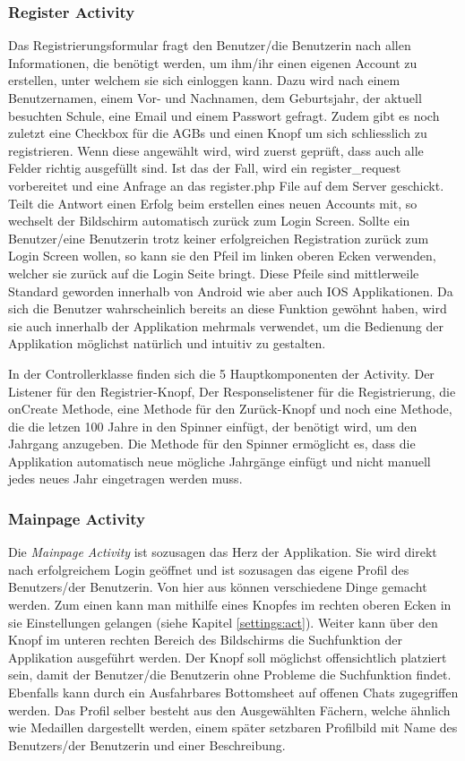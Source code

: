 \documentclass[a4paper,11pt]{report}
\begin{document}
				\subsubsection{Register Activity} \label{register:act}
				Das Registrierungsformular fragt den Benutzer/die Benutzerin nach allen Informationen, die benötigt werden, um ihm/ihr einen eigenen Account zu erstellen, unter welchem sie sich einloggen kann. Dazu wird nach einem Benutzernamen, einem Vor- und Nachnamen, dem Geburtsjahr, der aktuell besuchten Schule, eine Email und einem Passwort gefragt. Zudem gibt es noch zuletzt eine Checkbox für die AGBs und einen Knopf um sich schliesslich zu registrieren. Wenn diese angewählt wird, wird zuerst geprüft, dass auch alle Felder richtig ausgefüllt sind. Ist das der Fall, wird ein register\_request vorbereitet und eine Anfrage an das register.php File auf dem Server geschickt. Teilt die Antwort einen Erfolg beim erstellen eines neuen Accounts mit, so wechselt der Bildschirm automatisch zurück zum Login Screen. Sollte ein Benutzer/eine Benutzerin trotz keiner erfolgreichen Registration zurück zum Login Screen wollen, so kann sie den Pfeil im linken oberen Ecken verwenden, welcher sie zurück auf die Login Seite bringt. Diese Pfeile sind mittlerweile Standard geworden innerhalb von Android wie aber auch IOS Applikationen. Da sich die Benutzer wahrscheinlich bereits an diese Funktion gewöhnt haben, wird sie auch innerhalb der Applikation mehrmals verwendet, um die Bedienung der Applikation möglichst natürlich und intuitiv zu gestalten.
				
				In der Controllerklasse finden sich die 5 Hauptkomponenten der Activity. Der Listener für den Registrier-Knopf, Der Responselistener für die Registrierung, die onCreate Methode, eine Methode für den Zurück-Knopf und noch eine Methode, die die letzen 100 Jahre in den Spinner einfügt, der benötigt wird, um den Jahrgang anzugeben. Die Methode für den Spinner ermöglicht es, dass die Applikation automatisch neue mögliche Jahrgänge einfügt und nicht manuell jedes neues Jahr eingetragen werden muss.
				\subsubsection{Mainpage Activity} \label{mainpage:act}
				Die \emph{Mainpage Activity} ist sozusagen das Herz der Applikation. Sie wird direkt nach erfolgreichem Login geöffnet und ist sozusagen das eigene Profil des Benutzers/der Benutzerin. Von hier aus können verschiedene Dinge gemacht werden. Zum einen kann man mithilfe eines Knopfes im rechten oberen Ecken in sie Einstellungen gelangen (siehe Kapitel \ref{settings:act}). Weiter kann über den Knopf im unteren rechten Bereich des Bildschirms die Suchfunktion der Applikation ausgeführt werden. Der Knopf soll möglichst offensichtlich platziert sein, damit der Benutzer/die Benutzerin ohne Probleme die Suchfunktion findet. Ebenfalls kann durch ein Ausfahrbares Bottomsheet auf offenen Chats zugegriffen werden. Das Profil selber besteht aus den Ausgewählten Fächern, welche ähnlich wie Medaillen dargestellt werden, einem später setzbaren Profilbild mit Name des Benutzers/der Benutzerin und einer Beschreibung.
				
\end{document}
